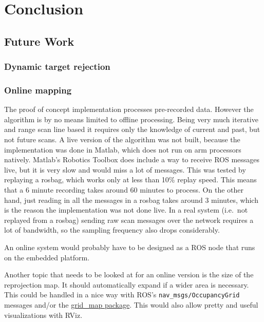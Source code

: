 \chapter{Conclusion}\label{conclusion}

\section{Future Work}\label{future-work}

\subsection{Dynamic target rejection}\label{dynamic-target-rejection}

\subsection{Online mapping}\label{online-mapping}

The proof of concept implementation processes pre-recorded data. However
the algorithm is by no means limited to offline processing. Being very
much iterative and range scan line based it requires only the knowledge
of current and past, but not future scans. A live version of the
algorithm was not built, because the implementation was done in Matlab,
which does not run on arm processors natively. Matlab's Robotics Toolbox
does include a way to receive ROS messages live, but it is very slow and
would miss a lot of messages. This was tested by replaying a rosbag,
which works only at less than 10\% replay speed. This means that a 6
minute recording takes around 60 minutes to process. On the other hand,
just reading in all the messages in a rosbag takes around 3 minutes,
which is the reason the implementation was not done live. In a real
system (i.e.~not replayed from a rosbag) sending raw scan messages over
the network requires a lot of bandwidth, so the sampling frequency also
drops considerably.

An online system would probably have to be designed as a ROS node that
runs on the embedded platform.

Another topic that needs to be looked at for an online version is the
size of the reprojection map. It should automatically expand if a wider
area is necessary. This could be handled in a nice way with ROS's
\texttt{nav\_msgs/OccupancyGrid} messages and/or the
\href{http://wiki.ros.org/grid_map}{grid\_map package}. This would also
allow pretty and useful visualizations with RViz.

